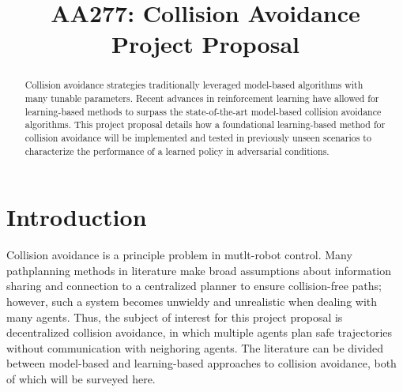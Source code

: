 \documentclass[conference]{IEEEtran}
\begin{document}
\title{AA277: Collision Avoidance Project Proposal\\
}

\author{
\and
{}
\linebreakand
{}
\and
{}
}

\maketitle

\begin{abstract}
Collision avoidance strategies traditionally leveraged model-based algorithms with many tunable parameters. Recent advances in reinforcement learning have allowed for learning-based methods to surpass the state-of-the-art model-based collision avoidance algorithms. This project proposal details how a foundational learning-based method for collision avoidance will be implemented and tested in previously unseen scenarios to characterize the performance of a learned policy in adversarial conditions.
\end{abstract}
\section{Introduction}
Collision avoidance is a principle problem in mutlt-robot control. Many pathplanning methods in literature make broad assumptions about information sharing and connection to a centralized planner to ensure collision-free paths; however, such a system becomes unwieldy and unrealistic when dealing with many agents. Thus, the subject of interest for this project proposal is decentralized collision avoidance, in which multiple agents plan safe trajectories without communication with neighoring agents. The literature can be divided between model-based and learning-based approaches to collision avoidance, both of which will be surveyed here.
\end{document}

